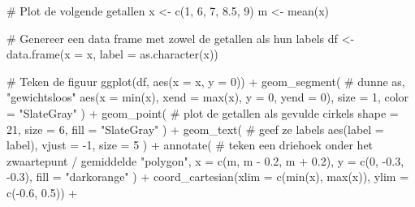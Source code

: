 \documentclass[
  a4paper,
]{scrbook}
\newenvironment{Shaded}{\begin{snugshade}}{\end{snugshade}}
\newcommand{\AttributeTok}[1]{\textcolor[rgb]{0.40,0.45,0.13}{#1}}
\newcommand{\CommentTok}[1]{\textcolor[rgb]{0.37,0.37,0.37}{#1}}
\newcommand{\DecValTok}[1]{\textcolor[rgb]{0.68,0.00,0.00}{#1}}
\newcommand{\FloatTok}[1]{\textcolor[rgb]{0.68,0.00,0.00}{#1}}
\newcommand{\FunctionTok}[1]{\textcolor[rgb]{0.28,0.35,0.67}{#1}}
\newcommand{\NormalTok}[1]{\textcolor[rgb]{0.00,0.23,0.31}{#1}}
\newcommand{\OtherTok}[1]{\textcolor[rgb]{0.00,0.23,0.31}{#1}}
\newcommand{\SpecialCharTok}[1]{\textcolor[rgb]{0.37,0.37,0.37}{#1}}
\newcommand{\StringTok}[1]{\textcolor[rgb]{0.13,0.47,0.30}{#1}}
\theoremstyle{definition}
\theoremstyle{definition}
\theoremstyle{remark}
\begin{document}
\begin{Shaded}
\begin{Highlighting}[]
\CommentTok{\# Plot de volgende getallen}
\NormalTok{x }\OtherTok{\textless{}{-}} \FunctionTok{c}\NormalTok{(}\DecValTok{1}\NormalTok{, }\DecValTok{6}\NormalTok{, }\DecValTok{7}\NormalTok{, }\FloatTok{8.5}\NormalTok{, }\DecValTok{9}\NormalTok{)}
\NormalTok{m }\OtherTok{\textless{}{-}} \FunctionTok{mean}\NormalTok{(x)}

\CommentTok{\# Genereer een data frame met zowel de getallen als hun labels}
\NormalTok{df }\OtherTok{\textless{}{-}} \FunctionTok{data.frame}\NormalTok{(}\AttributeTok{x =}\NormalTok{ x, }\AttributeTok{label =} \FunctionTok{as.character}\NormalTok{(x))}

\CommentTok{\# Teken de figuur}
\FunctionTok{ggplot}\NormalTok{(df, }\FunctionTok{aes}\NormalTok{(}\AttributeTok{x =}\NormalTok{ x, }\AttributeTok{y =} \DecValTok{0}\NormalTok{)) }\SpecialCharTok{+}
  \FunctionTok{geom\_segment}\NormalTok{( }\CommentTok{\# dunne as, "gewichtsloos"}
    \FunctionTok{aes}\NormalTok{(}\AttributeTok{x =} \FunctionTok{min}\NormalTok{(x), }\AttributeTok{xend =} \FunctionTok{max}\NormalTok{(x), }\AttributeTok{y =} \DecValTok{0}\NormalTok{, }\AttributeTok{yend =} \DecValTok{0}\NormalTok{),}
    \AttributeTok{size =} \DecValTok{1}\NormalTok{, }
    \AttributeTok{color =} \StringTok{"SlateGray"}
\NormalTok{    ) }\SpecialCharTok{+}
  \FunctionTok{geom\_point}\NormalTok{( }\CommentTok{\# plot de getallen als gevulde cirkels}
    \AttributeTok{shape =} \DecValTok{21}\NormalTok{, }\AttributeTok{size =} \DecValTok{6}\NormalTok{, }\AttributeTok{fill =} \StringTok{"SlateGray"}
\NormalTok{    ) }\SpecialCharTok{+} 
  \FunctionTok{geom\_text}\NormalTok{( }\CommentTok{\# geef ze labels}
    \FunctionTok{aes}\NormalTok{(}\AttributeTok{label =}\NormalTok{ label), }\AttributeTok{vjust =} \SpecialCharTok{{-}}\DecValTok{1}\NormalTok{, }\AttributeTok{size =} \DecValTok{5}
\NormalTok{    ) }\SpecialCharTok{+}   
  \FunctionTok{annotate}\NormalTok{( }\CommentTok{\# teken een driehoek onder het zwaartepunt / gemiddelde}
    \StringTok{"polygon"}\NormalTok{, }
    \AttributeTok{x =} \FunctionTok{c}\NormalTok{(m, m }\SpecialCharTok{{-}} \FloatTok{0.2}\NormalTok{, m }\SpecialCharTok{+} \FloatTok{0.2}\NormalTok{),}
    \AttributeTok{y =} \FunctionTok{c}\NormalTok{(}\DecValTok{0}\NormalTok{, }\SpecialCharTok{{-}}\FloatTok{0.3}\NormalTok{, }\SpecialCharTok{{-}}\FloatTok{0.3}\NormalTok{), }
    \AttributeTok{fill =} \StringTok{"darkorange"}
\NormalTok{    ) }\SpecialCharTok{+} 
  \FunctionTok{coord\_cartesian}\NormalTok{(}\AttributeTok{xlim =} \FunctionTok{c}\NormalTok{(}\FunctionTok{min}\NormalTok{(x), }\FunctionTok{max}\NormalTok{(x)), }\AttributeTok{ylim =} \FunctionTok{c}\NormalTok{(}\SpecialCharTok{{-}}\FloatTok{0.6}\NormalTok{, }\FloatTok{0.5}\NormalTok{)) }\SpecialCharTok{+}

\end{Highlighting}
\end{Shaded}
\end{document}

